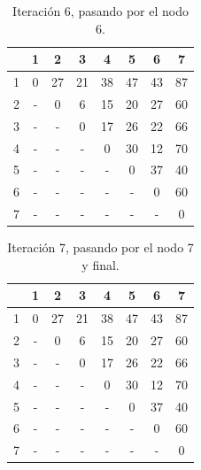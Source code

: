 \documentclass[letterpaper,10pt]{article}
\begin{document}
\begin{enumerate}
        \begin{minipage}[t]{0.47\textwidth}
            \begin{table}[H]
                \centering
            \begin{tabular}{|c|c|c|c|c|c|c|c|}\hline
                   & 1 & 2 & 3 & 4 & 5 & 6 & 7   \\ \hline
                 1 & 0  & 27 & 21 & 38 & 47 & 43 & 87     \\\hline
                 2 & -  & 0  & 6  & 15  & 20  & 27  & 60  \\\hline
                 3 & -  & -  & 0  & 17  & 26  & 22  & 66  \\\hline
                 4 & -  & -  & -  & 0  & 30  & 12  & 70   \\\hline
                 5 & -  & -  & -  & -  & 0  & 37  & 40  \\\hline
                 6 & -  & -  & -  & -  & -  & 0  & 60   \\\hline
                 7 & -  & -  & -  & -  & -  & -  & 0   \\\hline
                \end{tabular}
                \caption{Iteración 6, pasando por el nodo 6.}
                \label{tablitafloyd6}
            \end{table}
        \end{minipage}
        \begin{minipage}[t]{0.47\textwidth}
            \begin{table}[H]
                \centering
            \begin{tabular}{|c|c|c|c|c|c|c|c|}\hline
                   & 1 & 2 & 3 & 4 & 5 & 6 & 7   \\ \hline
                 1 & 0  & 27 & 21 & 38 & 47 & 43 & 87     \\\hline
                 2 & -  & 0  & 6  & 15  & 20  & 27  & 60  \\\hline
                 3 & -  & -  & 0  & 17  & 26  & 22  & 66  \\\hline
                 4 & -  & -  & -  & 0  & 30  & 12  & 70   \\\hline
                 5 & -  & -  & -  & -  & 0  & 37  & 40  \\\hline
                 6 & -  & -  & -  & -  & -  & 0  & 60   \\\hline
                 7 & -  & -  & -  & -  & -  & -  & 0   \\\hline
                \end{tabular}
                \caption{Iteración 7, pasando por el nodo 7 y final.}
                \label{tablitafloyd7}
            \end{table}
        \end{minipage}


\end{enumerate}
\end{document}
